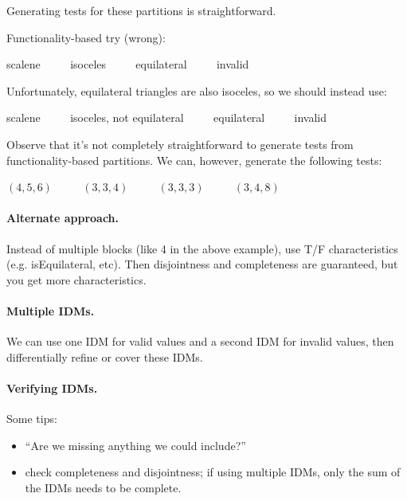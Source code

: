 \documentclass[11pt]{article}
\begin{document}
Generating tests for these partitions is straightforward.

Functionality-based try (wrong):

\begin{center}
scalene $\qquad$ isoceles $\qquad$ equilateral $\qquad$ invalid 
\end{center}

Unfortunately, equilateral triangles are also isoceles, so we should instead use:

\begin{center}
scalene $\qquad$ isoceles, not equilateral $\qquad$ equilateral $\qquad$ invalid 
\end{center}

Observe that it's not completely straightforward to generate tests
from functionality-based partitions. We can, however, generate the following tests:

\begin{center}
$(4, 5, 6)$ $\qquad$ $(3, 3, 4)$ $\qquad$ $(3,3,3)$ $\qquad$ $(3, 4, 8)$
\end{center}

\paragraph{Alternate approach.} Instead of multiple blocks (like 4 in the above
example), use T/F characteristics (e.g. isEquilateral, etc). Then
disjointness and completeness are guaranteed, but you get more characteristics.

\paragraph{Multiple IDMs.} We can use one IDM for valid values and
a second IDM for invalid values, then differentially refine or cover
these IDMs.

\paragraph{Verifying IDMs.} Some tips:

\begin{itemize}
\item ``Are we missing anything we could include?''
\item check completeness and disjointness; if using multiple IDMs, only the
sum of the IDMs needs to be complete.
\end{itemize}
\end{document}
